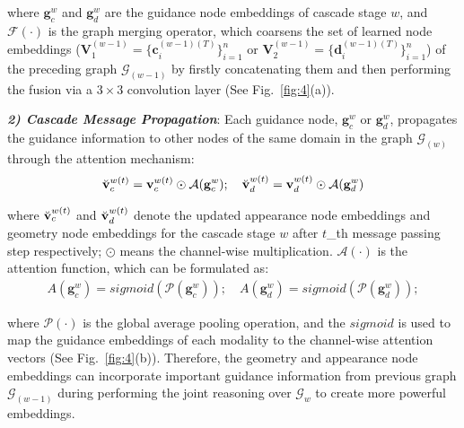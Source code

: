 \documentclass[runningheads]{llncs}
\begin{document}
\noindent where	$\mathbf g^{w}_{c}$ and $\mathbf g^{w}_{d}$ are the guidance node embeddings of cascade stage $w$, and ${\mathcal{F}}(\cdot)$ is the graph merging operator, which coarsens the set of learned node embeddings ($\mathbf V^{(w-1)}_1 = \{\mathbf c^{(w-1)(T)}_i \}^n_{i=1}$ or $\mathbf V^{(w-1)}_2 = \{\mathbf d^{(w-1)(T)}_i \}^n_{i=1}$) of the preceding graph $\mathcal G_{(w-1)}$ by firstly concatenating them and then performing the fusion via a $3\times3$ convolution layer (See Fig.~\ref{fig:4}(a)). 




\noindent \emph{\textbf{\footnotesize 2) Cascade Message Propagation}}: Each guidance node,  $\mathbf g^{w}_{c}$ or $\mathbf g^{w}_{d}$, propagates the guidance information to other nodes of the same domain in the graph $\mathcal G_{(w)}$ through the attention mechanism:
\begin{equation}
\begin{aligned}
\Breve {\mathbf v}_c^{w(t)} =  \mathbf v_c^{w(t)} \odot \mathcal A(\mathbf g^{w}_{c}); \quad \Breve {\mathbf v}_d^{w(t)} =  \mathbf v_d^{w(t)} \odot \mathcal A(\mathbf g^{w}_{d})
\label{eq10}
\end{aligned}
\end{equation}

\noindent where $\Breve {\mathbf v}_c^{w(t)}$ and $\Breve {\mathbf v}_d^{w(t)}$ denote the updated appearance node embeddings and geometry node embeddings for the cascade stage $w$ after $t$\_th message passing step respectively; $\odot$ means the channel-wise multiplication. $\mathcal A(\cdot)$ is the attention function, which can be formulated as:
\begin{equation}
\begin{aligned}
A(\mathbf g^{w}_{c}) = sigmoid (\mathcal P(\mathbf g^{w}_{c})); \quad A(\mathbf g^{w}_{d}) = sigmoid (\mathcal P(\mathbf g^{w}_{d})); 
\label{eq11}
\end{aligned}	
\end{equation}

\noindent where $\mathcal P(\cdot)$ is the global average pooling operation, and the $sigmoid$ is used to map the guidance embeddings of each modality to the channel-wise attention vectors (See Fig.~\ref{fig:4}(b)). Therefore, the geometry and appearance node embeddings can incorporate important guidance information from previous graph $\mathcal G_{(w-1)}$ during performing the joint reasoning over $\mathcal G_w$ to create more powerful embeddings. 
\end{document}
